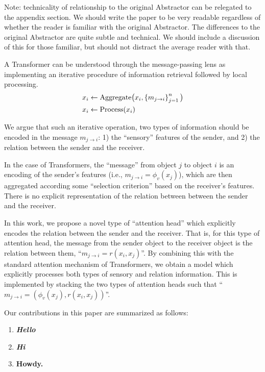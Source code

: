Note: technicality of relationship to the original Abstractor can be relegated to the appendix section. We should write the paper to be very readable regardless of whether the reader is familiar with the original Abstractor. The differences to the original Abstractor are quite subtle and technical. We should include a discussion of this for those familiar, but should not distract the average reader with that.



A Transformer can be understood through the message-passing lens as implementing an iterative procedure of information retrieval followed by local processing.
\begin{equation}\label{eq:intro_message_passing}
  \begin{split}
    x_i &\gets \mathrm{Aggregate}\big(x_i, \left\{m_{j \to i}\right\}_{j=1}^{n}\big) \\
    x_i &\gets \mathrm{Process}(x_i)
  \end{split}
\end{equation}

We argue that such an iterative operation, two types of information should be encoded in the message $m_{j \to i}$: 1) the ``sensory'' features of the sender, and 2) the relation between the sender and the receiver.

In the case of Transformers, the ``message'' from object $j$ to object $i$ is an encoding of the sender's features (i.e., $m_{j \to i} = \phi_v(x_j)$), which are then aggregated according some ``selection criterion'' based on the receiver's features. There is no explicit representation of the relation between between the sender and the receiver.

In this work, we propose a novel type of ``attention head'' which explicitly encodes the relation between the sender and the receiver. That is, for this type of attention head, the message from the sender object to the receiver object is the relation between them, ``$m_{j \to i} = r(x_i, x_j)$''. By combining this with the standard attention mechanism of Transformers, we obtain a model which explicitly processes both types of sensory and relation information. This is implemented by stacking the two types of attention heads such that ``$m_{j \to i} = (\phi_v(x_j), r(x_i, x_j))$''.


Our contributions in this paper are summarized as follows:
\begin{enumerate}
  \item \textbf{\textit{Hello}}
  \item \textbf{\textit{Hi}}
  \item \textbf{Howdy.}
\end{enumerate}
